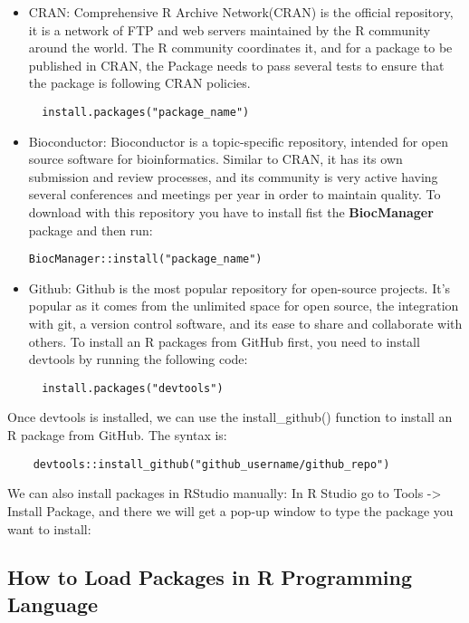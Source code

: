 \documentclass[
]{book}
\begin{document}
\begin{itemize}
\item
  CRAN: Comprehensive R Archive Network(CRAN) is the official repository, it is a network of FTP and web servers maintained by the R community around the world. The R community coordinates it, and for a package to be published in CRAN, the Package needs to pass several tests to ensure that the package is following CRAN policies.

\begin{verbatim}
  install.packages("package_name")
\end{verbatim}
\item
  Bioconductor: Bioconductor is a topic-specific repository, intended for open source software for bioinformatics. Similar to CRAN, it has its own submission and review processes, and its community is very active having several conferences and meetings per year in order to maintain quality.
  To download with this repository you have to install fist the \textbf{BiocManager} package and then run:

\begin{verbatim}
BiocManager::install("package_name")
\end{verbatim}
\item
  Github: Github is the most popular repository for open-source projects. It's popular as it comes from the unlimited space for open source, the integration with git, a version control software, and its ease to share and collaborate with others.
  To install an R packages from GitHub first, you need to install devtools by running the following code:

\begin{verbatim}
  install.packages("devtools")
\end{verbatim}
\end{itemize}

Once devtools is installed, we can use the install\_github() function to install an R package from GitHub. The syntax is:

\begin{verbatim}
    devtools::install_github("github_username/github_repo")
\end{verbatim}

We can also install packages in RStudio manually:
In R Studio go to Tools -\textgreater{} Install Package, and there we will get a pop-up window to type the package you want to install:

\hypertarget{how-to-load-packages-in-r-programming-language}{%
\subsection*{How to Load Packages in R Programming Language}\label{how-to-load-packages-in-r-programming-language}}
\end{document}
